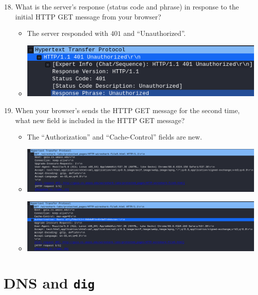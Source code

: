 \documentclass[11pt]{article}
\begin{document}
\begin{enumerate}
  \setcounter{enumi}{17}
\item What is the server’s response (status code and phrase) in response to the
  initial HTTP GET message from your browser?
  \begin{itemize}
  \item The server responded with $401$ and ``Unauthorized''.
  \item \includegraphics[width=\textwidth]{img/ws-auth-1}
  \end{itemize}
\item When your browser’s sends the HTTP GET message for the second time, what
  new field is included in the HTTP GET message?
  \begin{itemize}
  \item The ``Authorization'' and ``Cache-Control'' fields are new.
  \item \includegraphics[width=\textwidth]{img/ws-auth-new-fields-1}
  \item \includegraphics[width=\textwidth]{img/ws-auth-new-fields-2}
  \end{itemize}
\end{enumerate}

\section{DNS and \texttt{dig}}
\end{document}
